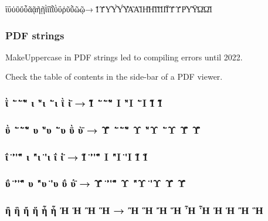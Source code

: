 \documentclass[a4paper]{article}
\newcommand*{\ux}[2]{\ignorespaces#1}
\newcommand*{\ux}[2]{\ignorespaces#2}
\newcommand*{\Greek}{\foreignlanguage{greek}}
\newcommand*{\Greek}{\ensuregreek}
\newcommand*{\TestUppercase}[1]{\Greek{#1 → \MakeUppercase{#1}}}
\begin{document}
\renewcommand*{\sample}{ΐΰὐὒὔὖᾶᾷῆῇῒΐῖῗῢΰῤῦῧῶῷ}
\sample → \MakeUppercase{\sample}


\subsubsection{PDF strings}

MakeUppercase in PDF strings led to compiling errors until 2022.

\ifdefined \AddToNoCaseChangeList %
  Check the table of contents in the side-bar of a PDF viewer.

  \subsubsection{\TestUppercase{
        ῒ \accdialytikavaria{\textiota}
        \"`{\textiota}\"\`{\textiota}\`"{\textiota}\`\"{\textiota}
        \ux{\accdialytikavaria ι \`"ι \"`ι \`\"ι \"\`ι}
           {\accdialytikavaria i \`"i \"`i \`\"i \"\`i}}}

  \subsubsection{\TestUppercase{
        ῢ \accdialytikavaria{\textupsilon}
        \"`{\textupsilon}\"\`{\textupsilon}\`"{\textupsilon}\`\"{\textupsilon}
        \ux{\accdialytikavaria υ \`"υ \"`υ \`\"υ \"\`υ}
           {\accdialytikavaria u \`"u \"`u \`\"u \"\`u}}}
  \subsubsection{\TestUppercase{
        ΐ \accdialytikaoxia\textiota{}
        \"'{\textiota}\"\'{\textiota}\'"{\textiota}\'\"{\textiota}
        \ux{\accdialytikaoxia ι \'"ι \"'ι \'\"ι \"\'ι}
           {\accdialytikaoxia i \'"i \"'i \'\"i \"\'i}}}
  \subsubsection{\TestUppercase{
        ΰ \accdialytikaoxia\textupsilon{}
        \"'{\textupsilon}\"\'{\textupsilon}\'"{\textupsilon}\'\"{\textupsilon}
        \ux{\accdialytikaoxia υ \'"υ \"'υ \'\"υ \"\'υ}
           {\accdialytikaoxia u \'"u \"'u \'\"u \"\'u}}}
  \subsubsection{\TestUppercase{ἢ ἣ ἤ ἥ ἦ ἧ Ἠ Ἡ Ἢ Ἣ}}
\fi
\end{document}
